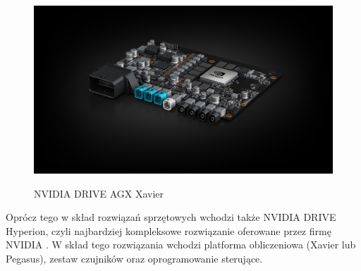 \begin{enumerate*}
\begin{figure}[h]
\begin{center}
\includegraphics[width=15cm]{resources/figures/nv-drive-xavier.jpg}
\caption{NVIDIA DRIVE AGX Xavier}
\label{NvidiaDriveXavier}
\end{center}
\end{figure}
\end{enumerate*}

\vspace{-1cm}
Oprócz tego w skład rozwiązań sprzętowych wchodzi także NVIDIA DRIVE Hyperion, czyli najbardziej kompleksowe rozwiązanie oferowane przez firmę NVIDIA \cite{nvidiaDrive:hyperion}. W skład tego rozwiązania wchodzi platforma obliczeniowa (Xavier lub Pegasus), zestaw czujników oraz oprogramowanie sterujące.

